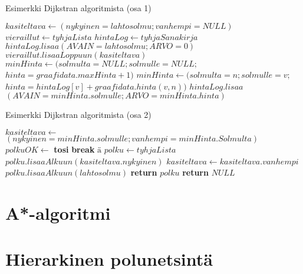 \begin{algorithm}
\caption{Esimerkki Dijkstran algoritmista (osa 1)}\label{DijkstrEsim}
\begin{algorithmic}
	\State $kasiteltava \gets (nykyinen=lahtosolmu;vanhempi=NULL)$
	\State $vieraillut \gets tyhjaLista$
	\State $hintaLog \gets tyhjaSanakirja$
	\State $hintaLog.lisaa(AVAIN=lahtosolmu;ARVO=0)$
		\State $vieraillut.lisaaLoppuun(kasiteltava)$
		\State $minHinta \gets (solmulta=NULL;solmulle=NULL;$
		\State $hinta=graafidata.maxHinta+1)$
					\State $minHinta \gets (solmulta=n;solmulle=v;$
					\State $hinta=hintaLog[v]+graafidata.hinta(v,n))$
				\EndIf
			\EndFor
		\EndFor
		\State $hintaLog.lisaa$
		\State $(AVAIN=minHinta.solmulle;ARVO=minHinta.hinta)$

\end{algorithmic}
\end{algorithm}
\begin{algorithm}
\caption{Esimerkki Dijkstran algoritmista (osa 2)}
\begin{algorithmic}

		\State $kasiteltava \gets$
		\State $(nykyinen=minHinta.solmulle;vanhempi=minHinta.Solmulta)$
			\State $polkuOK \gets$ \textbf{ tosi}
			\State \textbf{break} $ä$
		\EndIf
	\EndWhile
		\State $polku \gets tyhjaLista$
			\State $polku.lisaaAlkuun(kasiteltava.nykyinen)$
			\State $kasiteltava \gets kasiteltava.vanhempi$
		\EndWhile
		\State $polku.lisaaAlkuun(lahtosolmu)$
		\State \textbf{return} $polku$
	\Else
		\State \textbf{return} $NULL$
	\EndIf
\EndProcedure
\end{algorithmic}
\end{algorithm}

\section{A*-algoritmi}\label{aStar}
\section{Hierarkinen polunetsintä}\label{hpa}
